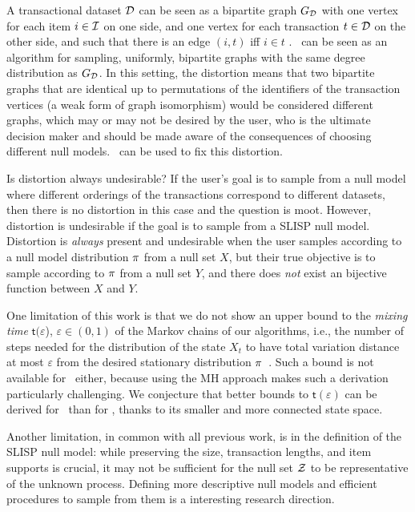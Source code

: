 A transactional dataset $\mathcal{D}$ can be seen as a bipartite graph $G_{\mathcal{D}}$
with one vertex for each item $i \in \mathcal{I}$ on one side, and one vertex for
each transaction $t \in \mathcal{D}$ on the other side, and such that there is an
edge $(i,t)$ iff $i \in t$ \citep[Sect.\ 4.1]{GionisMMT07}. \gioalgo\ can be
seen as an algorithm for sampling, uniformly, bipartite graphs with the same
degree distribution as $G_{\mathcal{D}}$. In this setting, the distortion means that
two bipartite graphs that are identical up to permutations of the identifiers of
the transaction vertices (a weak form of graph isomorphism) would be considered
different graphs, which may or may not be desired by the user, who is the
ultimate decision maker and should be made aware of the consequences of choosing
different null models. \algo\ can be used to fix this distortion.

Is distortion always undesirable? If the user's goal is to sample from a null
model where different orderings of the transactions correspond to different
datasets, then there is no distortion in this case and the question is moot.
However, distortion is undesirable if the goal is to sample from a SLISP null
model. Distortion is \emph{always} present and undesirable when the user samples
according to a null model distribution $\pi$ from a null set $X$, but
their true objective is to sample according to $\pi$ from a null set $Y$,
and there does \emph{not} exist an bijective function between $X$ and $Y$.

One limitation of this work is that we do not show an upper bound to the
\emph{mixing time} $\mathsf{t}(\varepsilon$), $\varepsilon \in (0,1)$ of the
Markov chains of our algorithms, i.e., the number of steps needed for the
distribution of the state $X_t$ to have total variation distance at most
$\varepsilon$ from the desired stationary distribution
$\pi$~\citep[Ch.\ 10]{MitzenmacherU05}. Such a bound is not available for
\gioalgo\ either, because using the MH approach makes such a derivation
particularly challenging. We conjecture that better bounds to
$\mathsf{t}(\varepsilon)$ can be derived for \ than for \naivealgo,
thanks to its smaller and more connected state space.

Another limitation, in common with all previous work, is in the definition of
the SLISP null model: while preserving the size, transaction lengths, and item
supports is crucial, it may not be sufficient for the null set $\mathcal{Z}$ to be
representative of the unknown process. Defining more descriptive null models and
efficient procedures to sample from them is a interesting research direction.
